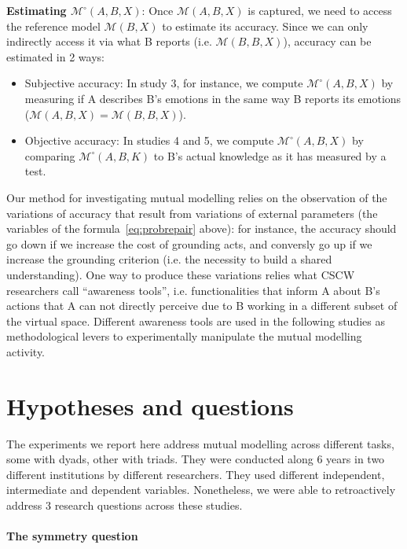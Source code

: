 \documentclass[natbib]{svjour3}
\newcommand{\ie}{i.e.\xspace}
\newcommand{\A}{A\xspace}
\newcommand{\B}{B\xspace}
\newcommand{\M}[3]{{\mathcal{M}(#1, #2, #3)}}
\newcommand{\model}[3]{{$\mathcal{M}(#1, #2, #3)$}}
\newcommand{\refmodel}[2]{{$\mathcal{M}(#1, #2)$}}
\newcommand{\Model}[3]{{$\mathcal{M}^{\circ}(#1, #2, #3)$}}
\begin{document}
{\bf Estimating \Model{A}{B}{X}}: Once \model{A}{B}{X} is captured, we need to
access the reference model \refmodel{B}{X} to estimate its accuracy.
Since we can only indirectly access it via what \B reports (\ie
\model{B}{B}{X}), accuracy can be estimated in 2 ways:

\begin{itemize}

    \item Subjective accuracy: In study 3, for instance, we compute \Model{A}{B}{X} by
        measuring if \A describes \B's emotions in the same way \B reports
        its emotions ($\M{A}{B}{X} = \M{B}{B}{X}$).

    \item Objective accuracy: In studies 4 and 5, we compute \Model{A}{B}{X} by
        comparing \Model{A}{B}{K} to \B's actual knowledge as it has measured
        by a test.

\end{itemize}

Our method for investigating mutual modelling relies on the observation of the variations of
accuracy that result from variations of external parameters (the variables of
the formula~\ref{eq:probrepair} above): for instance, the accuracy should
go down if we increase the cost of grounding acts, and conversly go up if we increase
the grounding criterion (\ie the necessity to build a shared understanding). One way
to produce these variations relies what CSCW researchers call ``awareness
tools'', \ie functionalities that inform \A about \B's actions that \A can
not directly perceive due to \B working in a different subset of the
virtual space. Different awareness tools are used in the following studies as
methodological levers to experimentally manipulate the mutual modelling
activity.


\section{Hypotheses and questions}

The experiments we report here address mutual modelling across different tasks,
some with dyads, other with triads. They were conducted along 6 years in two
different institutions by different researchers. They used different
independent, intermediate and dependent variables. Nonetheless, we were able to
retroactively address 3 research questions across these studies. 

\paragraph{The symmetry question}
\end{document}
